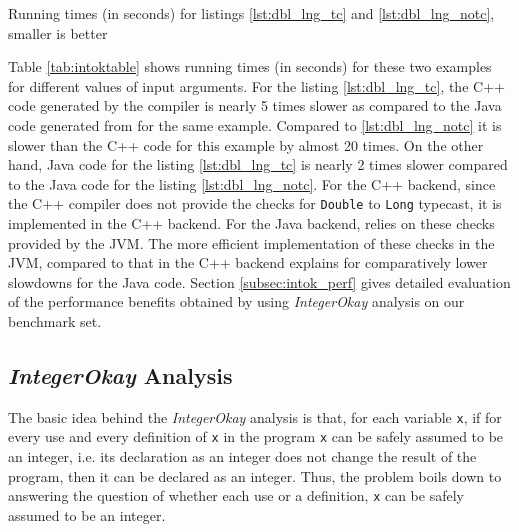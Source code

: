 \begin{table}[htbp]

\caption{Running times (in seconds) for listings \ref{lst:dbl_lng_tc} and
\ref{lst:dbl_lng_notc}, smaller is better}
\label{tab:intoktable}
\end{table}

Table \ref{tab:intoktable} shows running times (in seconds) for these
two examples for different values of input arguments. For the listing
\ref{lst:dbl_lng_tc}, the C++ code generated by the \xten compiler is
nearly 5 times slower as compared to the Java code generated from \xten for
the same example.  Compared to \ref{lst:dbl_lng_notc} it is slower than
the C++ code for this example by almost 20 times. On the other hand,
Java code for the listing \ref{lst:dbl_lng_tc} is nearly 2 times slower
compared to the Java code for the listing \ref{lst:dbl_lng_notc}.  For
the C++ backend, since the C++ compiler does not provide the checks for
\texttt{Double} to \texttt{Long} typecast, it is implemented in the
\xten C++ backend. For the Java backend, \xten relies on these checks
provided by the JVM.  The more efficient implementation of these checks
in the JVM, compared to that in the \xten C++ backend explains for
comparatively lower slowdowns for the Java code. Section
\ref{subsec:intok_perf} gives detailed evaluation of the performance
benefits obtained by using \emph{IntegerOkay} analysis on our benchmark
set.

\subsection{\emph{IntegerOkay} Analysis}

The basic idea behind the \emph{IntegerOkay} analysis is that, for each 
variable \verb|x|, if for every use and every definition of \verb|x| in the
program \verb|x| can be safely assumed to be an integer, i.e. its
declaration as an integer does not change the result of the program,
then it can be declared as an integer. Thus, the problem boils down to
answering the question of whether each use or a definition,
\verb|x| can be safely assumed to be an integer.

